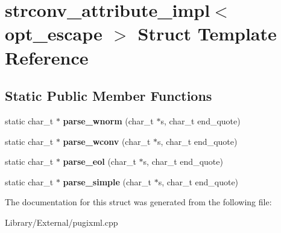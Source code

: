 \hypertarget{structstrconv__attribute__impl}{}\section{strconv\+\_\+attribute\+\_\+impl$<$ opt\+\_\+escape $>$ Struct Template Reference}
\label{structstrconv__attribute__impl}
\subsection*{Static Public Member Functions}
\begin{DoxyCompactItemize}
\item 
\hypertarget{structstrconv__attribute__impl_a9b7f8b1e860c5d022dbd29f9a89e9e27}{}static char\+\_\+t $\ast$ {\bfseries parse\+\_\+wnorm} (char\+\_\+t $\ast$s, char\+\_\+t end\+\_\+quote)\label{structstrconv__attribute__impl_a9b7f8b1e860c5d022dbd29f9a89e9e27}

\item 
\hypertarget{structstrconv__attribute__impl_a2d39998b79896af7c53c5f3dc22a526b}{}static char\+\_\+t $\ast$ {\bfseries parse\+\_\+wconv} (char\+\_\+t $\ast$s, char\+\_\+t end\+\_\+quote)\label{structstrconv__attribute__impl_a2d39998b79896af7c53c5f3dc22a526b}

\item 
\hypertarget{structstrconv__attribute__impl_a0f57ee9d69b9d626765f4a9c8af6df2e}{}static char\+\_\+t $\ast$ {\bfseries parse\+\_\+eol} (char\+\_\+t $\ast$s, char\+\_\+t end\+\_\+quote)\label{structstrconv__attribute__impl_a0f57ee9d69b9d626765f4a9c8af6df2e}

\item 
\hypertarget{structstrconv__attribute__impl_a8358dc980178e55c8669b9dcd04872d7}{}static char\+\_\+t $\ast$ {\bfseries parse\+\_\+simple} (char\+\_\+t $\ast$s, char\+\_\+t end\+\_\+quote)\label{structstrconv__attribute__impl_a8358dc980178e55c8669b9dcd04872d7}

\end{DoxyCompactItemize}


The documentation for this struct was generated from the following file\+:\begin{DoxyCompactItemize}
\item 
Library/\+External/pugixml.\+cpp\end{DoxyCompactItemize}
